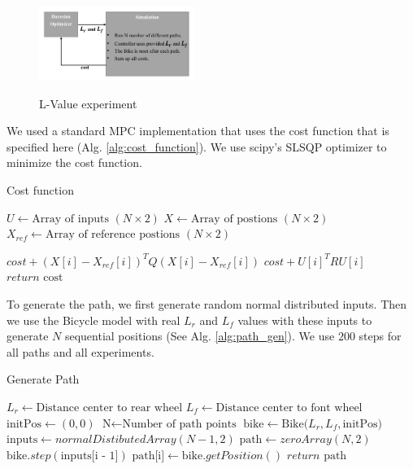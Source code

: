 \documentclass[twoside,twocolumn]{article}
\begin{document}
\begin{figure}[h]
    \caption{L-Value experiment}
    \centering
    \includegraphics[width=0.45\textwidth]{fig_l_value_experiment.pdf}
    \label{fig:l_value_experiment}
\end{figure}

We used a standard MPC implementation that uses the cost function that is specified here (Alg. \ref{alg:cost_function}). We use scipy's SLSQP optimizer to minimize the cost function.
\begin{algorithm}
    \caption{Cost function}
    \label{alg:cost_function}
    \begin{algorithmic}
        \State $U \gets \text{Array of inputs } (N \times 2)$
        \State $X \gets \text{Array of postions } (N \times 2)$
        \State $X_{ref} \gets \text{Array of reference postions } (N \times 2)$

            \State $cost + (X[i] - X_{ref}[i])^T Q (X[i] - X_{ref}[i])$
            \State $cost + U[i]^T R U[i]$
        \EndFor
        \State $return \text{ cost}$
    \end{algorithmic}
\end{algorithm}

To generate the path, we first generate random normal distributed inputs. Then we use the Bicycle model with real $L_r$ and $L_f$ values with these inputs to generate $N$ sequential positions (See Alg. \ref{alg:path_gen}). We use $200$ steps for all paths and all experiments.
\begin{algorithm}
    \caption{Generate Path}
    \label{alg:path_gen}
    \begin{algorithmic}
        \State $L_r \gets \text{Distance center to rear wheel}$
        \State $L_f \gets \text{Distance center to font wheel}$
        \State $\text{initPos} \gets (0,0)$
        \State $\text{N} \gets \text{Number of path points}$
        \State $\text{bike} \gets \text{Bike(}L_r, L_f, \text{initPos}\text{)}$
        \State $\text{inputs} \gets normalDistibutedArray(N - 1, 2)$
        \State $\text{path} \gets zeroArray(N, 2)$
            \State $\text{bike}.step(\text{inputs[i - 1]})$
            \State $\text{path[i]} \gets \text{bike}.getPosition()$
        \EndFor
        \State $return \text{ path}$
    \end{algorithmic}
\end{algorithm}
\end{document}

